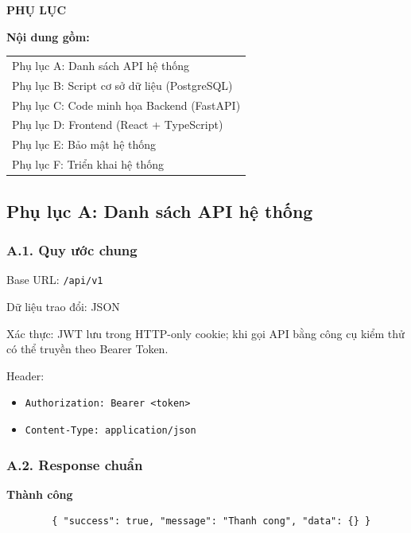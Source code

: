 \documentclass[13pt,a4paper]{extarticle}
\numberwithin{figure}{section}
\numberwithin{table}{section}
\begin{document}
	
	\newpage
	\begin{center}
		\fontsize{14pt}{20pt}\selectfont
		\textbf{PHỤ LỤC}
	\end{center}
	
	\noindent\textbf{Nội dung gồm:}
	
	\noindent
	\begin{tabular}{@{}l@{}}
		Phụ lục A: Danh sách API hệ thống\\
		Phụ lục B: Script cơ sở dữ liệu (PostgreSQL)\\
		Phụ lục C: Code minh họa Backend (FastAPI)\\
		Phụ lục D: Frontend (React + TypeScript)\\
		Phụ lục E: Bảo mật hệ thống\\
		Phụ lục F: Triển khai hệ thống
	\end{tabular}
	
	\subsection*{Phụ lục A: Danh sách API hệ thống}
	
	\subsubsection*{A.1. Quy ước chung}
	
	\noindent
	Base URL: \texttt{/api/v1}
	
	\noindent
	Dữ liệu trao đổi: JSON
	
	\noindent
	Xác thực: JWT lưu trong HTTP-only cookie; khi gọi API bằng công cụ kiểm thử có thể truyền theo Bearer Token.
	
	\noindent
	Header:
	\begin{itemize}
		\item \texttt{Authorization: Bearer \textless token\textgreater}
		\item \texttt{Content-Type: application/json}
	\end{itemize}
	
	\subsubsection*{A.2. Response chuẩn}
	
	\noindent
	\textbf{Thành công}
	
	\noindent
	\begin{lstlisting}
		{ "success": true, "message": "Thanh cong", "data": {} }
	\end{lstlisting}
	
\end{document}

